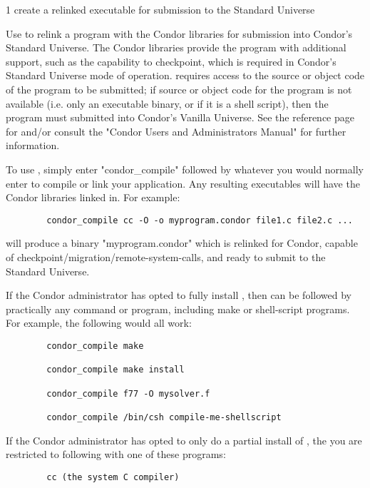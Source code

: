 \begin{ManPage}{\label{man-condor-compile}}{1}
{create a relinked executable for submission to the Standard Universe}

\Synopsis {}

\Description

Use  to relink a program with the Condor libraries for
submission into Condor's Standard Universe.
The Condor libraries provide the program with additional support, such
as the capability to checkpoint, which is required in Condor's
Standard Universe mode of operation.
 requires access to the source or object code of the
program to be submitted; if source or object code for the program is
not available (i.e. only an executable binary, or if it is a shell
script), then the program must submitted into Condor's Vanilla
Universe.
See the reference page for  and/or consult the "Condor
Users and Administrators Manual" for further information.

To use , simply enter "condor\_compile" followed by
whatever you would normally enter to compile or link your
application.
Any resulting executables will have the Condor libraries linked in.
For example: 
\begin{verbatim}
        condor_compile cc -O -o myprogram.condor file1.c file2.c ... 
\end{verbatim}
will produce a binary "myprogram.condor" which is relinked for Condor,
capable of checkpoint/migration/remote-system-calls, and ready to
submit to the Standard Universe.  

If the Condor administrator has opted to fully install
, then  can be followed by practically
any command or program, including make or shell-script programs.
For example, the following would all work:
\begin{verbatim}
        condor_compile make 

        condor_compile make install 

        condor_compile f77 -O mysolver.f 

        condor_compile /bin/csh compile-me-shellscript 
\end{verbatim}

If the Condor administrator has opted to only do a partial install of
, the you are restricted to following 
with one of these programs:  
\begin{verbatim}
        cc (the system C compiler) 


\end{verbatim}
\end{ManPage}
